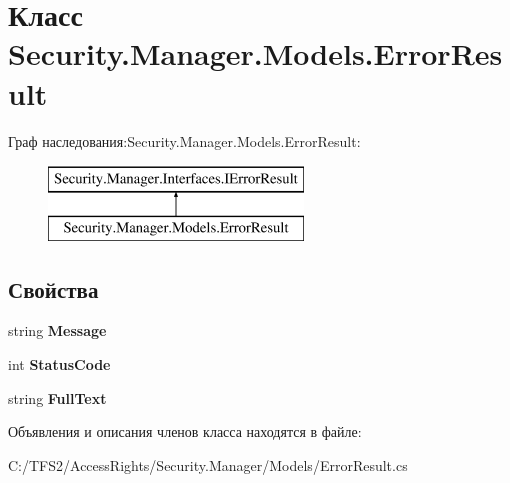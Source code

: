 \hypertarget{class_security_1_1_manager_1_1_models_1_1_error_result}{}\section{Класс Security.\+Manager.\+Models.\+Error\+Result}
\label{class_security_1_1_manager_1_1_models_1_1_error_result}
Граф наследования\+:Security.\+Manager.\+Models.\+Error\+Result\+:\begin{figure}[H]
\begin{center}
\leavevmode
\includegraphics[height=2.000000cm]{d2/d56/class_security_1_1_manager_1_1_models_1_1_error_result}
\end{center}
\end{figure}
\subsection*{Свойства}
\begin{DoxyCompactItemize}
\item 
\mbox{\label{class_security_1_1_manager_1_1_models_1_1_error_result_afdee601f8fb3847e751e7a2b44cd0690}} 
string {\bfseries Message}
\item 
\mbox{\label{class_security_1_1_manager_1_1_models_1_1_error_result_a6b2432f0eedd023c78bb5f87986003e0}} 
int {\bfseries Status\+Code}
\item 
\mbox{\label{class_security_1_1_manager_1_1_models_1_1_error_result_a8cdbbf836ba324529f0796e10e9df44c}} 
string {\bfseries Full\+Text}
\end{DoxyCompactItemize}


Объявления и описания членов класса находятся в файле\+:\begin{DoxyCompactItemize}
\item 
C\+:/\+T\+F\+S2/\+Access\+Rights/\+Security.\+Manager/\+Models/Error\+Result.\+cs\end{DoxyCompactItemize}
